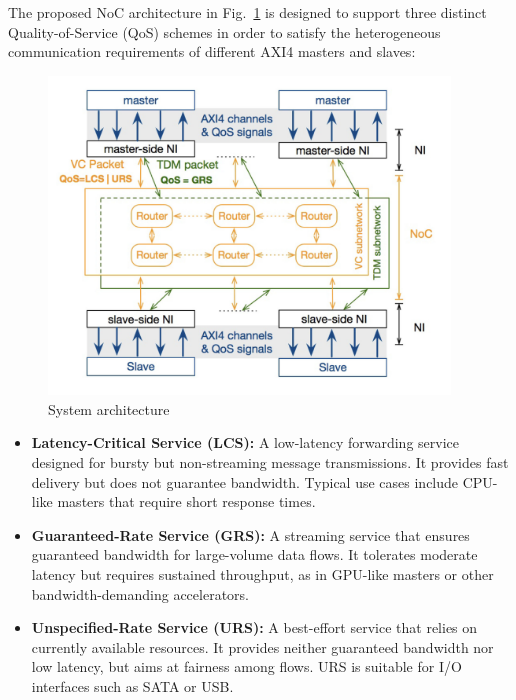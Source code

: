 The proposed NoC architecture in Fig.~\ref{fig:System_Architecture} is designed to support three distinct Quality-of-Service (QoS) schemes in order to satisfy the heterogeneous communication requirements of different AXI4 masters and slaves:

\begin{figure}[htbp]
    \centering
    \includegraphics[width=0.95\textwidth]{img/System Architecture.png}
    \caption{System architecture}
    \label{fig:System_Architecture}
\end{figure}

\begin{itemize}
    \item \textbf{Latency-Critical Service (LCS):}\label{LCS} A low-latency forwarding service designed for bursty but non-streaming message transmissions. It provides fast delivery but does not guarantee bandwidth. Typical use cases include CPU-like masters that require short response times.
    \item \textbf{Guaranteed-Rate Service (GRS):}\label{GRS} A streaming service that ensures guaranteed bandwidth for large-volume data flows. It tolerates moderate latency but requires sustained throughput, as in GPU-like masters or other bandwidth-demanding accelerators.
    \item \textbf{Unspecified-Rate Service (URS):}\label{URS} A best-effort service that relies on currently available resources. It provides neither guaranteed bandwidth nor low latency, but aims at fairness among flows. URS is suitable for I/O interfaces such as SATA or USB.
\end{itemize}

